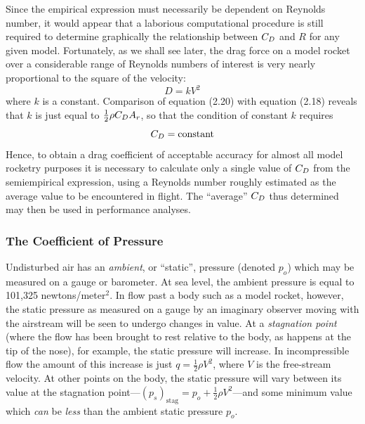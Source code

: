 Since the empirical expression must necessarily be dependent on Reynolds number, it
would appear that a laborious computational procedure is still required to
determine graphically the relationship between $C_{D}$ and $R$ for any given model.
Fortunately, as we shall see later, the drag force on a model rocket over a
considerable range of Reynolds numbers of interest is very nearly proportional to
the square of the velocity:
\begin{equation}\label{ch3:eq:20}
D = kV^{2}
\end{equation}
where $k$ is a constant. Comparison of equation (2.20) with equation
(2.18) reveals that $k$ is just equal to
$\tfrac{1}{2}\rho C_{D} A_r$, so that the condition of constant $k$ requires
\begin{equation}\label{ch3:eq:21}
C_{D} = \text{constant}
\end{equation}
Hence, to obtain a drag coefficient of acceptable accuracy for almost all model
rocketry purposes it is necessary to calculate only a single value of $C_{D}$ from
the semiempirical expression, using a Reynolds number roughly estimated as the
average value to be encountered in flight. The ``average'' $C_{D}$ thus determined may
then be used in performance analyses.

\subsubsection{The Coefficient of Pressure}\label{ch3:sec:2.2.3}

Undisturbed air has an \emph{ambient}, or ``static'', pressure (denoted $p_o$) which
may be measured on a gauge or barometer. At sea level, the ambient pressure is equal
to 101,325 newtons/meter$^{2}$. In flow past a body such as a model rocket, however,
the static pressure as measured on a gauge by an imaginary observer moving with the
airstream will be seen to undergo changes in value. At a \emph{stagnation point}
(where the flow has been brought to rest relative to the body, as happens at the tip
of the nose), for example, the static pressure will increase. In incompressible flow
the amount of this increase is just $q = \tfrac{1}{2}\rho V^{2}$, where $V$ is the
free-stream velocity. At other points on the body, the static pressure will vary
between its value at the stagnation
point---$(p_s)_{\mathrm{stag}} = p_o + \tfrac{1}{2}\rho V^{2}$---and some minimum
value which \emph{can} be \emph{less} than the ambient static pressure $p_o$.

